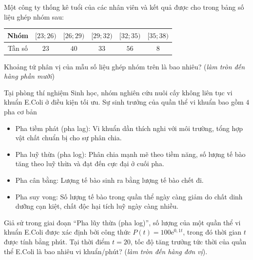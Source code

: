 \begin{ex}%
	Một công ty thống kê tuổi của các nhân viên và kết quả được cho trong bảng số liệu ghép nhóm sau:
	\begin{center}
		\begin{tabular}{|c|c|c|c|c|c|}
			\hline
			Nhóm & $[23;26)$ & $[26;29)$ & $[29;32)$ & $[32;35)$ & $[35;38)$ \\
			\hline
			Tần số & $23$ & $40$ & $33$ & $56$ & $8$ \\
			\hline
		\end{tabular}
	\end{center}
	Khoảng tứ phân vị của mẫu số liệu ghép nhóm trên là bao nhiêu? (\textit{làm tròn đến hàng phần mười})
	\par{}
	\loigiai{
		Tổng số liệu $N=160$.\\
		$Q_1$ thuộc nhóm $[26;29)$, $Q_1=26+\dfrac{\tfrac{1}{4}\cdot 160-23}{40}\cdot 3=\dfrac{1091}{40}$.\\
		$Q_3$ thuộc nhóm $[32;35)$, $Q_3=32+\dfrac{\tfrac{3}{4}\cdot 160-(23+40+33)}{56}\cdot 3=\dfrac{233}{7}$.\\
		$\Delta Q=Q_3-Q_1=\dfrac{233}{7}-\dfrac{1091}{40}\approx 6$.
	}
\end{ex}

\begin{ex}%
	Tại phòng thí nghiệm Sinh học, nhóm nghiên cứu nuôi cấy không liên tục vi khuẩn E.Coli ở điều kiện tối ưu. Sự sinh trưởng của quần thể vi khuẩn bao gồm $4$ pha cơ bản
	\begin{itemize}
		\item  Pha tiềm phát (pha lag): Vi khuẩn dần thích nghi với môi trường, tổng hợp vật chất chuẩn bị cho sự phân chia.
		\item Pha luỹ thừa (pha log): Phân chia mạnh mẽ theo tiềm năng, số lượng tế bào tăng theo luỹ thừa và đạt đến cực đại ở cuối pha.
		\item Pha cân bằng: Lượng tế bào sinh ra bằng lượng tế bào chết đi.
		\item Pha suy vong: Số lượng tế bào trong quần thể ngày càng giảm do chất dinh dưỡng cạn kiệt, chất độc hại tích luỹ ngày càng nhiều.
	\end{itemize}
	Giả sử trong giai đoạn “Pha lũy thừa (pha log)”, số lượng của một quần thể vi khuẩn E.Coli được xác định bởi công thức $P(t)=100\mathrm{e}^{0{,}1t}$, trong đó thời gian $t$ được tính bằng phút. Tại thời điểm $t=20$, tốc độ tăng trưởng tức thời của quần thể E.Coli là bao nhiêu vi khuẩn/phút? (\textit{làm tròn đến hàng đơn vị}).
	\par{}
\end{ex}

